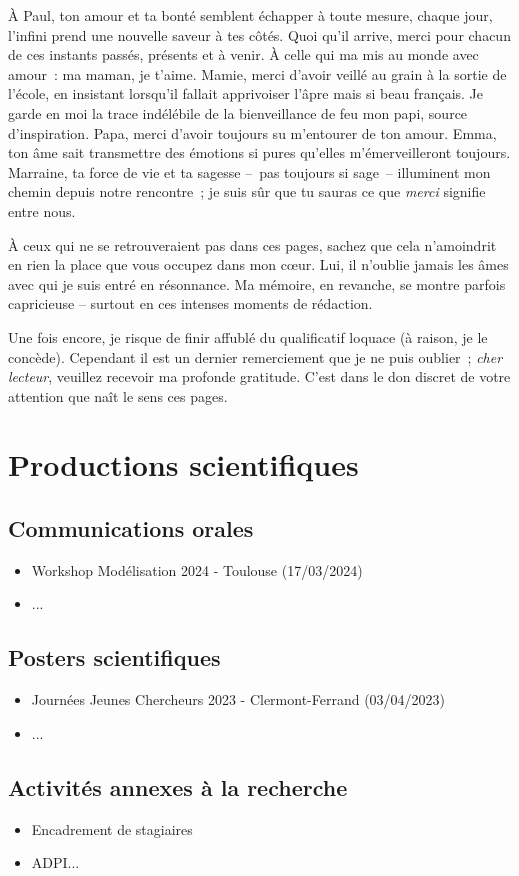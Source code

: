 {À Paul, ton amour et ta bonté semblent échapper à toute mesure, chaque jour, l'infini prend une nouvelle saveur à tes côtés. Quoi qu'il arrive, merci pour chacun de ces instants passés, présents et à venir. À celle qui ma mis au monde avec amour~: ma maman, je t'aime. Mamie, merci d'avoir veillé au grain à la sortie de l'école, en insistant lorsqu'il fallait apprivoiser l'âpre mais si beau français. Je garde en moi la trace indélébile de la bienveillance de feu mon papi, source d'inspiration. Papa, merci d'avoir toujours su m'entourer de ton amour. Emma, ton âme sait transmettre des émotions si pures qu'elles m'émerveilleront toujours. Marraine, ta force de vie et ta sagesse --~pas toujours si sage~-- illuminent mon chemin depuis notre rencontre~; je suis sûr que tu sauras ce que \textit{merci} signifie entre nous.

À ceux qui ne se retrouveraient pas dans ces pages, sachez que cela n'amoindrit en rien la place que vous occupez dans mon c\oe ur. Lui, il n'oublie jamais les âmes avec qui je suis entré en résonnance. Ma mémoire, en revanche, se montre parfois capricieuse -- surtout en ces intenses moments de rédaction.

Une fois encore, je risque de finir affublé du qualificatif \og loquace \fg{} (à raison, je le concède). Cependant il est un dernier remerciement que je ne puis oublier~; \textit{cher lecteur}, veuillez recevoir ma profonde gratitude. C'est dans le don discret de votre attention que naît le sens ces pages.
\endgroup}%

\newpage
{}
\section*{Productions scientifiques}
\subsection*{Communications orales}
\begin{itemize}
    \item Workshop Modélisation 2024 - Toulouse (17/03/2024)
    \item ...
\end{itemize}

\subsection*{Posters scientifiques}

\begin{itemize}
    \item Journées Jeunes Chercheurs 2023 - Clermont-Ferrand (03/04/2023)
    \item ...
\end{itemize}

\vspace{10pt}

\subsection*{Activités annexes à la recherche}
\begin{itemize}
    \item Encadrement de stagiaires
    \item ADPI...
\end{itemize}
